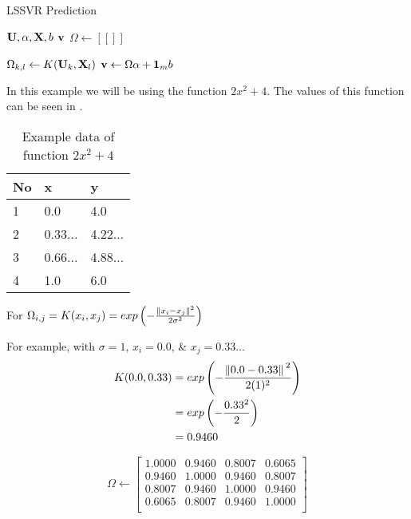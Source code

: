 \begin{algorithm}[H]
  \caption{LSSVR Prediction}\label{alg:lssvr_prediction}
  \begin{algorithmic}[1]
    \Require $\vb{U}, \vb{\alpha}, \vb{X}, b$
    \Ensure $\vb{v}$
    \State $\Omega \gets [[]]$ 

    \State$\Omega_{k,l}\gets K(\vb{U}_{k},\vb{X}_l)$
    \EndFor
    \EndFor
    \State $\vb{v} \gets \Omega\vb{\alpha} + \vb{1}_{m}b$
  \end{algorithmic}
\end{algorithm}

In this example we will be using the function \(2x^2+4\). The values of this function can be seen in .

\begin{table}[H]
  \centering
  \begin{tabular}{@{}lll@{}}
    \toprule
    No & x       & y       \\ \midrule
    1  & 0.0     & 4.0     \\
    2  & 0.33... & 4.22... \\
    3  & 0.66... & 4.88... \\
    4  & 1.0     & 6.0     \\
    \bottomrule
  \end{tabular}
  \caption{Example data of function $2x^2+4$} \label{table:1}
\end{table}
For $\Omega_{i,j}=K(x_i,x_j)=exp \left(-\frac{\norm*{x_i-x_j}^2}{2\sigma^2}\right)$

For example, with $\sigma=1$, $x_i=0.0$, \& $x_j = 0.33\dots$
\begin{equation}
  \begin{split}
    K(0.0,0.33) & = exp\left(-\frac{\norm*{0.0-0.33}^2}{2(1)^2}\right) \\
                & = exp\left(-\frac{0.33^2}{2}\right)                  \\
                & = 0.9460
  \end{split}
\end{equation}

\begin{equation}
  \Omega\gets
  \begin{bmatrix}
    1.0000 & 0.9460 & 0.8007 & 0.6065 \\
    0.9460 & 1.0000 & 0.9460 & 0.8007 \\
    0.8007 & 0.9460 & 1.0000 & 0.9460 \\
    0.6065 & 0.8007 & 0.9460 & 1.0000 \\
  \end{bmatrix}
\end{equation}

